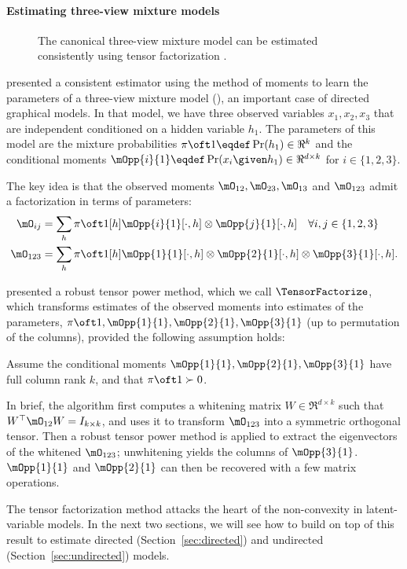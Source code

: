 \paragraph{Estimating three-view mixture models}

\begin{figure}[t]
  \label{fig:three-view}
  \centering
  
  \caption{The canonical three-view mixture model can be estimated consistently using tensor factorization \citep{anandkumar13tensor}.}
\end{figure}

\citet{anandkumar12moments} presented a consistent estimator
  using the method of moments to learn the parameters of a three-view
  mixture model (), an important case of directed
  graphical models. %
In that model, we have three observed variables $x_1, x_2, x_3$
  that are independent conditioned on a hidden variable $h_1$.  
The parameters of this model are the mixture probabilities $\pi\oft 1 \eqdef
  \Pr(h_1) \in \Re^k$ and the conditional moments $\mOpp{i}{1} \eqdef
  \Pr(x_i \given h_1) \in \Re^{d \times k}$ for $i \in \{1,2,3\}$.

  The key idea is that the observed moments $\mO_{12}, \mO_{23}, \mO_{13}$ and
  $\mO_{123}$ admit a factorization in terms of parameters:
\begin{align*}
  \mO_{ij} &= \sum_h {\pi \oft 1}[h] {\mOpp{i}{1}}[\cdot,h] \otimes {\mOpp{j}{1}}[\cdot,h] \quad \forall i,j \in \{1,2,3\} \\
  \mO_{123} &= \sum_h {\pi \oft 1}[h] {\mOpp{1}{1}}[\cdot,h] \otimes {\mOpp{2}{1}}[\cdot,h] \otimes  {\mOpp{3}{1}}[\cdot,h].
\end{align*}

\citet{anandkumar13tensor} presented a robust tensor power method, which
  we call $\TensorFactorize$, which transforms estimates of the observed moments 
  into estimates of the parameters, $\pi\oft 1, \mOpp{1}{1},
  \mOpp{2}{1},\mOpp{3}{1}$ (up to permutation of the columns), provided
  the following assumption holds:

\begin{assumption}
\label{asm:full-rank}
Assume the conditional moments $\mOpp{1}{1}, \mOpp{2}{1}, \mOpp{3}{1}$ have full column rank
  $k$, and that $\pi\oft 1 \succ 0$.
\end{assumption}

In brief, the algorithm first computes a whitening matrix $W \in
  \Re^{d \times k}$ such that $W^\top \mO_{12} W = I_{k \times k}$,
  and uses it to transform $\mO_{123}$ into a symmetric orthogonal tensor.  
Then a robust tensor power method is applied to extract the eigenvectors
of the whitened $\mO_{123}$; unwhitening yields the columns of $\mOpp{3}{1}$.
  $\mOpp{1}{1}$ and $\mOpp{2}{1}$ can then be recovered with a few matrix operations.

The tensor factorization method attacks the heart of the non-convexity
  in latent-variable models.  In the next two sections,
  we will see how to build on top of this result to estimate directed (Section~\ref{sec:directed})
  and undirected (Section~\ref{sec:undirected}) models.
